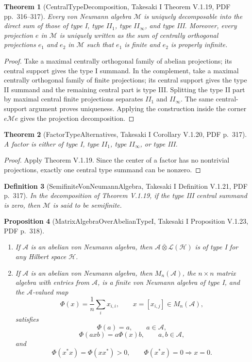 \documentclass{article}
\newtheorem{definition}{Definition}
\newtheorem{theorem}[definition]{Theorem}
\newtheorem{proposition}[definition]{Proposition}
\begin{document}
\begin{theorem}[CentralTypeDecomposition, Takesaki I Theorem V.1.19, PDF pp.~316--317]
Every von Neumann algebra \(\mathcal M\) is uniquely decomposable into the
direct sum of those of type I, type \(II_1\), type \(II_\infty\), and type
III.  Moreover, every projection \(e\) in \(\mathcal M\) is uniquely written
as the sum of centrally orthogonal projections \(e_1\) and \(e_2\) in
\(\mathcal M\) such that \(e_1\) is finite and \(e_2\) is properly infinite.
\end{theorem}

\begin{proof}
Take a maximal centrally orthogonal family of abelian projections; its central
support gives the type I summand.  In the complement, take a maximal centrally
orthogonal family of finite projections; its central support gives the type II
summand and the remaining central part is type III.  Splitting the type II
part by maximal central finite projections separates \(II_1\) and
\(II_\infty\).  The same central-support argument proves uniqueness.  Applying
the construction inside the corner \(e\mathcal M e\) gives the projection
decomposition.
\end{proof}

\begin{theorem}[FactorTypeAlternatives, Takesaki I Corollary V.1.20, PDF p.~317]
A factor is either of type I, type \(II_1\), type \(II_\infty\), or type III.
\end{theorem}

\begin{proof}
Apply Theorem V.1.19.  Since the center of a factor has no nontrivial
projections, exactly one central type summand can be nonzero.
\end{proof}

\begin{definition}[SemifiniteVonNeumannAlgebra, Takesaki I Definition V.1.21, PDF p.~317]
In the decomposition of Theorem V.1.19, if the type III central summand is
zero, then \(\mathcal M\) is said to be semifinite.
\end{definition}

\begin{proposition}[MatrixAlgebraOverAbelianTypeI, Takesaki I Proposition V.1.23, PDF p.~318]
\leavevmode
\begin{enumerate}
\item If \(\mathcal A\) is an abelian von Neumann algebra, then
\(\mathcal A\bar\otimes\mathcal L(\mathcal H)\) is of type I for any Hilbert
space \(\mathcal H\).
\item If \(\mathcal A\) is an abelian von Neumann algebra, then
\(M_n(\mathcal A)\), the \(n\times n\) matrix algebra with entries from
\(\mathcal A\), is a finite von Neumann algebra of type I, and the
\(\mathcal A\)-valued map
\[
  \Phi(x)=\frac1n\sum_i x_{i,i},
  \qquad x=[x_{i,j}]\in M_n(\mathcal A),
\]
satisfies
\[
  \Phi(a)=a,\qquad a\in\mathcal A,
\]
\[
  \Phi(axb)=a\Phi(x)b,\qquad a,b\in\mathcal A,
\]
and
\[
  \Phi(x^*x)=\Phi(xx^*)>0,\qquad
  \Phi(x^*x)=0\Rightarrow x=0.
\]
\end{enumerate}
\end{proposition}
\end{document}
